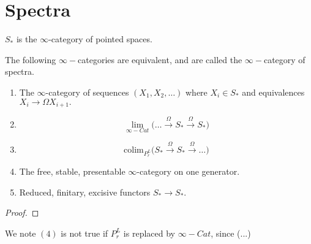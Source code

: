 \section{Spectra}
\begin{definition}
    $S_*$ is the $\infty$-category of pointed spaces.
\end{definition}
\begin{lemma}
    The following $\infty-$categories are equivalent, and are called the $\infty-$category of spectra.
    \begin{enumerate}
        \item The $\infty$-category of sequences $(X_1,X_2,\dots)$ where $X_i\in S_*$ and equivalences $X_i\rightarrow \Omega X_{i+1}.$
        \item $$\lim_{\infty-Cat}\big(\dots \xrightarrow{\Omega} S_*\xrightarrow{\Omega} S_* \big)$$
        \item $$\text{colim}_{P_r^L}\big(S_*\xrightarrow{\Omega} S_*\xrightarrow{\Omega}\dots \big)$$
        \item The free, stable, presentable $\infty$-category on one generator.
        \item Reduced, finitary, excisive functors $S_*\rightarrow S_*$.
    \end{enumerate}
\end{lemma}
\begin{proof}
    
\end{proof}
We note $(4)$ is not true if $P_r^L$ is replaced by $\infty-Cat$, since (...)